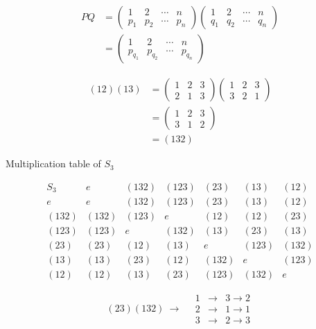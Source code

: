 \documentclass[a4paper,11pt]{article}
\begin{document}
\vspace*{0.35cm}
\begin{align*}
PQ
&=\left(\begin{array}{cccc}1&2&\cdots&n\\p_1&p_2&\cdots&p_n\end{array}\right)
  \left(\begin{array}{cccc}1&2&\cdots&n\\q_1&q_2&\cdots&q_n\end{array}\right)\\[0.8em]
&=\left(\begin{array}{cccc}1&2&\cdots&n\\p_{q_1}&p_{q_2}&\cdots&p_{q_n}\end{array}\right)
\end{align*}
\hfill
\begin{minipage}{0.40\textwidth}
\begin{align*}
(12)(13)
&=\left(\begin{array}{ccc}1&2&3\\2&1&3\end{array}\right)
  \left(\begin{array}{ccc}1&2&3\\3&2&1\end{array}\right)\\[0.4em]
&=\left(\begin{array}{ccc}1&2&3\\3&1&2\end{array}\right)\\[0.4em]
&=(132)
\end{align*}
\end{minipage}

\begin{center}
{\Large Multiplication table of $S_3$}
\end{center}
\[
\begin{array}{c|c|c|c|c|c|c}
S_3&e&(132)&(123)&(23)&(13)&(12)\\ \hline
e&e&(132)&(123)&(23)&(13)&(12)\\ \hline
(132)&(132)&(123)&e&(12)&(12)&(23)\\ \hline
(123)&(123)&e&(132)&(13)&(23)&(13)\\ \hline
(23)&(23)&(12)&(13)&e&(123)&(132)\\ \hline
(13)&(13)&(23)&(12)&(132)&e&(123)\\ \hline
(12)&(12)&(13)&(23)&(123)&(132)&e
\end{array}
\]

\[
(23)(132)\ \longrightarrow\quad
\begin{array}{rcl}
1&\longrightarrow&3\longrightarrow2\\
2&\longrightarrow&1\longrightarrow1\\
3&\longrightarrow&2\longrightarrow3
\end{array}
\]
\end{document}
